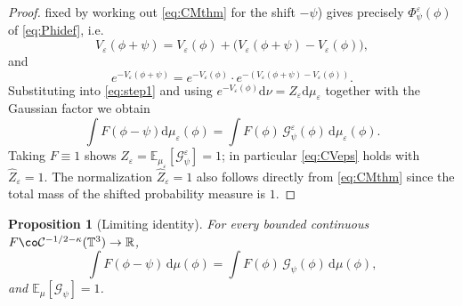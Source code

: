 \documentclass[12pt]{article}
\newtheorem{proposition}{Proposition}
\theoremstyle{definition}
\newcommand{\T}{\mathbb{T}^3}
\newcommand{\R}{\mathbb{R}}
\newcommand{\E}{\mathbb{E}}
\newcommand{\dd}{\mathrm{d}}
\begin{document}
\begin{proof}
fixed by working out \eqref{eq:CMthm} for the shift $-\psi$) gives precisely
$\Phi^\varepsilon_\psi(\phi)$ of \eqref{eq:Phidef}, i.e.
\begin{equation}\label{eq:VplusG}
  V_\varepsilon(\phi+\psi)
  =V_\varepsilon(\phi)+\Big(V_\varepsilon(\phi+\psi)-V_\varepsilon(\phi)\Big),
\end{equation}
and
\[
  e^{-V_\varepsilon(\phi+\psi)}
  =e^{-V_\varepsilon(\phi)}\cdot e^{-(V_\varepsilon(\phi+\psi)-V_\varepsilon(\phi))} .
\]
Substituting into \eqref{eq:step1} and using
$e^{-V_\varepsilon(\phi)}\dd\nu=Z_\varepsilon\dd\mu_\varepsilon$ together with the Gaussian
factor we obtain
\[
  \int F(\phi-\psi)\dd\mu_\varepsilon(\phi)
  =\int F(\phi)\,\mathcal G^\varepsilon_\psi(\phi)\,\dd\mu_\varepsilon(\phi).
\]
Taking $F\equiv1$ shows $\widehat Z_\varepsilon=\E_{\mu_\varepsilon}[\mathcal G^\varepsilon_\psi]=1$;
in particular \eqref{eq:CVeps} holds with $\widehat Z_\varepsilon=1$. The
normalization $\widehat Z_\varepsilon=1$ also follows directly from \eqref{eq:CMthm} since
the total mass of the shifted probability measure is $1$.
\end{proof}

\begin{proposition}[Limiting identity]\label{prop:limit}
For every bounded continuous $F\co\mathcal C^{-1/2-\kappa}(\T)\to\R$,
\begin{equation}\label{eq:CVlim}
  \int F(\phi-\psi)\,\dd\mu(\phi)
  =\int F(\phi)\,\mathcal G_\psi(\phi)\,\dd\mu(\phi),
\end{equation}
and $\E_\mu[\mathcal G_\psi]=1$.
\end{proposition}
\end{document}
